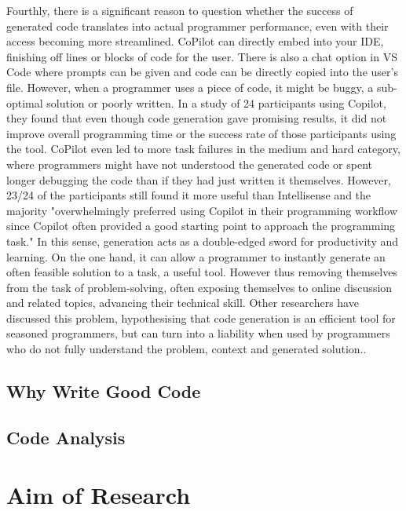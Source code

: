 \documentclass[manuscript,screen,review,sigconf]{acmart}
\begin{document}
Fourthly, there is a significant reason to question whether the success of generated code translates into actual programmer performance, even with their access becoming more streamlined. CoPilot can directly embed into your IDE, finishing off lines or blocks of code for the user. There is also a chat option in VS Code where prompts can be given and code can be directly copied into the user's file. However, when a programmer uses a piece of code, it might be buggy, a sub-optimal solution or poorly written. In a study of 24 participants using Copilot\cite{Expectation_vs_Experience}, they found that even though code generation gave promising results, it did not improve overall programming time or the success rate of those participants using the tool. CoPilot even led to more task failures in the medium and hard category, where programmers might have not understood the generated code or spent longer debugging the code than if they had just written it themselves. However, 23/24 of the participants still found it more useful than Intellisense and the majority "overwhelmingly preferred
using Copilot in their programming workflow since Copilot often provided a good starting point to approach the programming task." In this sense, generation acts as a double-edged sword for productivity and learning. On the one hand, it can allow a programmer to instantly generate an often feasible solution to a task, a useful tool. However thus removing themselves from the task of problem-solving, often exposing themselves to online discussion and related topics, advancing their technical skill. Other researchers have discussed this problem, hypothesising that code generation is an efficient tool for seasoned programmers, but can turn into a liability when used by programmers who do not fully understand the problem, context and generated solution.\cite{CopilotPairProgrammer}.

\subsection{Why Write Good Code}

\subsection{Code Analysis}


\section{Aim of Research}
\end{document}
